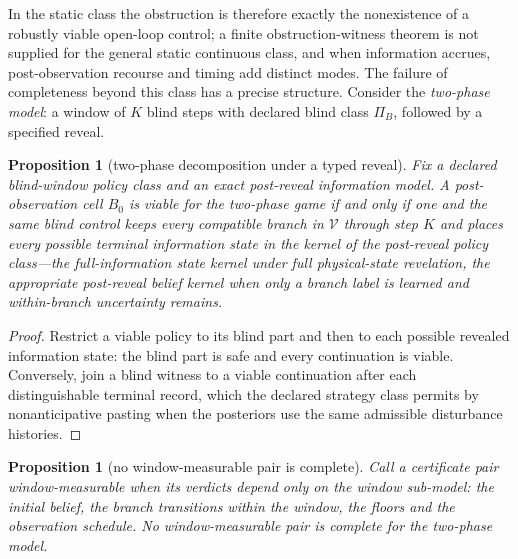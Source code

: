 \documentclass[11pt,a4paper]{article}
\theoremstyle{plain}
\newtheorem{proposition}[theorem]{Proposition}
\theoremstyle{definition}
\theoremstyle{remark}
\newcommand{\cV}{\mathcal{V}}
\begin{document}
In the static class the obstruction is therefore exactly the nonexistence of a robustly viable open-loop control; a finite obstruction-witness theorem is not supplied for the general static continuous class, and when information accrues, post-observation recourse and timing add distinct modes. The failure of completeness beyond this class has a precise structure. Consider the \emph{two-phase model}: a window of $K$ blind steps with declared blind class $\Pi_B$, followed by a specified reveal.

\begin{proposition}[two-phase decomposition under a typed reveal]\label{prop:decomposition}
Fix a declared blind-window policy class and an exact post-reveal information model. A post-observation cell $B_0$ is viable for the two-phase game if and only if one and the same blind control keeps every compatible branch in $\cV$ through step $K$ \emph{and} places every possible terminal information state in the kernel of the post-reveal policy class---the full-information state kernel under full physical-state revelation, the appropriate post-reveal \emph{belief} kernel when only a branch label is learned and within-branch uncertainty remains.
\end{proposition}

\begin{proof}
Restrict a viable policy to its blind part and then to each possible revealed information state: the blind part is safe and every continuation is viable. Conversely, join a blind witness to a viable continuation after each distinguishable terminal record, which the declared strategy class permits by nonanticipative pasting when the posteriors use the same admissible disturbance histories.
\end{proof}

\begin{proposition}[no window-measurable pair is complete]\label{prop:window-nogo}
Call a certificate pair \emph{window-measurable} when its verdicts depend only on the window sub-model: the initial belief, the branch transitions within the window, the floors and the observation schedule. No window-measurable pair is complete for the two-phase model.
\end{proposition}
\end{document}
